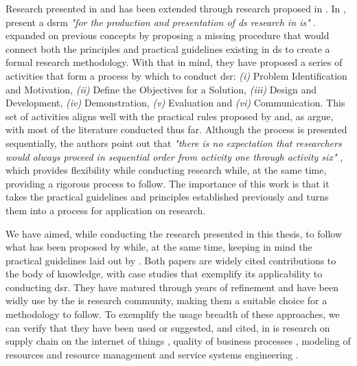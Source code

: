 Research presented in \cite{march_design_1995} and \cite{hevner_design_2004} has been extended through research proposed in \cite{peffers_design_2007}. In \cite{peffers_design_2007}, \citeauthor{peffers_design_2007} present a \gls{dsrm} \textit{"for the production and presentation of \gls{ds} research in \gls{is}"} \cite[3]{peffers_design_2007}. \citeauthor{peffers_design_2007} expanded on previous concepts by proposing a missing procedure \cite[7]{peffers_design_2007} that would connect both the principles and practical guidelines existing in \gls{ds} to create a formal research methodology. With that in mind, they have proposed a series of activities that form a process by which to conduct \gls{dsr}: \emph{(i)} Problem Identification and Motivation, \emph{(ii)} Define the Objectives for a Solution, \emph{(iii)} Design and Development, \emph{(iv)} Demonstration, \emph{(v)} Evaluation and \emph{(vi)} Communication. This set of activities aligns well with the practical rules proposed by \citeauthor{hevner_design_2004} and, as \citeauthor{peffers_design_2007} argue, with most of the literature conducted thus far. Although the process is presented sequentially, the authors point out that \textit{"there is no expectation that researchers would always proceed in sequential order from activity one through activity six"} \cite[14]{peffers_design_2007}, which provides flexibility while conducting research while, at the same time, providing a rigorous process to follow. The importance of this work is that it takes the practical guidelines and principles established previously and turns them into a process for application on research.

We have aimed, while conducting the research presented in this thesis, to follow what has been proposed by \citeauthor{peffers_design_2007} while, at the same time, keeping in mind the practical guidelines laid out by \citeauthor{hevner_design_2004}. Both papers are widely cited contributions to the body of knowledge, with case studies that exemplify its applicability to conducting \gls{dsr}. They have matured through years of refinement and have been widly use by the \gls{is} research community, making them a suitable choice for a methodology to follow. To exemplify the usage breadth of these approaches, we can verify that they have been used or suggested, and cited, in \gls{is} research on supply chain on the internet of things \cite{geerts_supply_2014}, quality of business processes \cite{heidari_quality_2014}, modeling of resources and resource management \cite{speitkamp_mathematical_2010} and service systems engineering \cite{bohmann_service_2014}.

